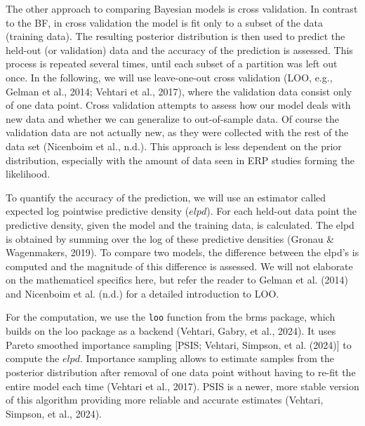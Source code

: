 \documentclass[
  doc,12pt,floatsintext]{apa7}
\begin{document}
The other approach to comparing Bayesian models is cross validation. In contrast to the BF, in cross validation the model is fit only to a subset of the data (training data). The resulting posterior distribution is then used to predict the held-out (or validation) data and the accuracy of the prediction is assessed. This process is repeated several times, until each subset of a partition was left out once. In the following, we will use leave-one-out cross validation (LOO, e.g., Gelman et al., 2014; Vehtari et al., 2017), where the validation data consist only of one data point. Cross validation attempts to assess how our model deals with new data and whether we can generalize to out-of-sample data. Of course the validation data are not actually new, as they were collected with the rest of the data set (Nicenboim et al., n.d.). This approach is less dependent on the prior distribution, especially with the amount of data seen in ERP studies forming the likelihood.

To quantify the accuracy of the prediction, we will use an estimator called expected log pointwise predictive density (\(elpd\)). For each held-out data point the predictive density, given the model and the training data, is calculated. The elpd is obtained by summing over the log of these predictive densities (Gronau \& Wagenmakers, 2019). To compare two models, the difference between the elpd's is computed and the magnitude of this difference is assessed. We will not elaborate on the mathematicel specifics here, but refer the reader to Gelman et al. (2014) and Nicenboim et al. (n.d.) for a detailed introduction to LOO.

For the computation, we use the \texttt{loo} function from the brms package, which builds on the loo package as a backend (Vehtari, Gabry, et al., 2024). It uses Pareto smoothed importance sampling {[}PSIS; Vehtari, Simpson, et al. (2024){]} to compute the \(elpd\). Importance sampling allows to estimate samples from the posterior distribution after removal of one data point without having to re-fit the entire model each time (Vehtari et al., 2017). PSIS is a newer, more stable version of this algorithm providing more reliable and accurate estimates (Vehtari, Simpson, et al., 2024).
\end{document}
